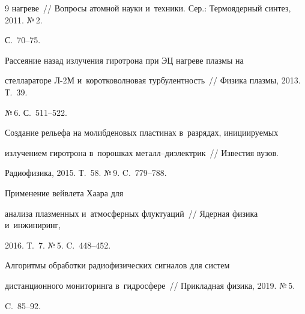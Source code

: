 {{\begin{thebibliography}{9}
нагреве~/\!\!/ Вопросы атомной науки и~техники. Сер.: Термоядерный синтез, 2011. №\,2. 

С.~70--75. 


 Рассеяние назад излучения гиротрона при ЭЦ нагреве плазмы на 

стеллараторе Л-2М и~коротковолновая турбулентность~/\!\!/ Физика плазмы, 2013. Т.~39. 

№\,6. С.~511--522.




 Создание рельефа на молибденовых пластинах в~разрядах, ини\-ци\-иру\-емых 

излучением гиротрона в~порошках ме\-талл--ди\-элект\-рик~/\!\!/ Известия вузов. 

Радиофизика, 2015. Т.~58. №\,9. C.~779--788.


 Применение вейвлета Хаара для 

анализа плазменных и~атмосферных флуктуаций~/\!\!/ Ядерная физика и~инжиниринг, 

2016. Т.~7. №\,5. C.~448--452.


 Алгоритмы обработки радиофизических сигналов для систем 

дистанционного мониторинга в~гидросфере~/\!\!/ Прикладная физика, 2019. №\,5. 

C.~85--92.

\end{thebibliography}

} }





